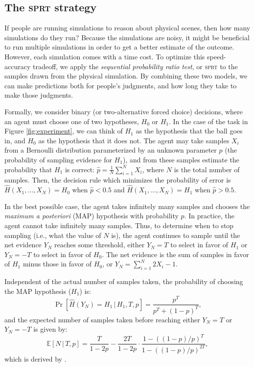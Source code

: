 \documentclass[10pt,letterpaper]{article}
\begin{document}
\subsection{The \textsc{sprt} strategy}

If people are running simulations to reason about physical scenes, then how many simulations do they run?
Because the simulations are noisy, it might be beneficial to run multiple simulations in order to get a better estimate of the outcome.
However, each simulation comes with a time cost.
To optimize this speed-accuracy tradeoff, we apply the \emph{sequential probability ratio test}, or \textsc{sprt} \cite{wald1947sequential} to the samples drawn from the physical simulation.
By combining these two models, we can make predictions both for people's judgments, and how long they take to make those judgments.

Formally, we consider binary (or two-alternative forced choice) decisions, where an agent must choose one of two hypotheses, $H_0$ or $H_1$.
In the case of the task in Figure \ref{fig:experiment}, we can think of $H_1$ as the hypothesis that the ball goes in, and $H_0$ as the hypothesis that it does not. 
The agent may take samples $X_i$ from a Bernoulli distribution parameterized by an unknown parameter $p$ (the probability of sampling evidence for $H_1$), and from these samples estimate the probability that $H_1$ is correct: $\hat{p}=\frac{1}{N}\sum_{i=1}^N X_i$, where $N$ is the total number of samples. 
Then, the decision rule which minimizes the probability of error is $\hat{H}(X_1,\ldots{},X_N)=H_0$ when $\hat{p}<0.5$ and $\hat{H}(X_1,\ldots{},X_N)=H_1$ when $\hat{p}>0.5$.

In the best possible case, the agent takes infinitely many samples and chooses the \emph{maximum a posteriori} (MAP) hypothesis with probability $p$. 
In practice, the agent cannot take infinitely many samples. 
Thus, to determine when to stop sampling (i.e., what the value of $N$ is), the agent continues to sample until the net evidence $Y_N$ reaches some threshold, either $Y_N=T$ to select in favor of $H_1$ or $Y_N=-T$ to select in favor of $H_0$. 
The net evidence is the sum of samples in favor of $H_1$ minus those in favor of $H_0$, or $Y_N=\sum_{i=1}^N 2X_i-1$.

Independent of the actual number of samples taken, the probability of choosing the MAP hypothesis ($H_1$) is:
\begin{equation}
\Pr[\hat{H}(Y_N)=H_1\,|\,H_1,T,p]=\frac{p^T}{p^T+(1-p)^T},
\label{eq:pr-choose-h1}
\end{equation}
and the expected number of samples taken before reaching either $Y_N=T$ or $Y_N=-T$ is given by:
\begin{equation}
\mathbb{E}[N\,|\,T,p]=\frac{T}{1-2p}-\frac{2T}{1-2p}\cdot{}\frac{1-((1-p)/p)^T}{1-((1-p)/p)^{2T}},
\label{eq:expsamp}
\end{equation}
which is derived by .
\end{document}
